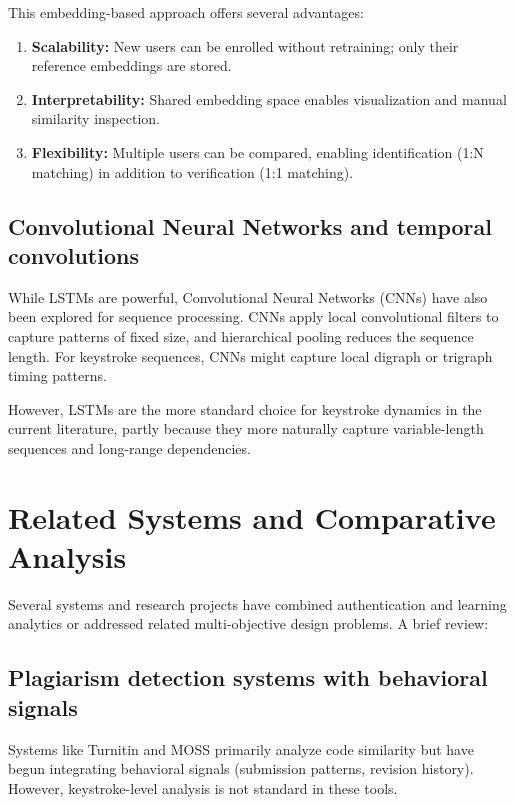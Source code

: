 This embedding-based approach offers several advantages:
\begin{enumerate}
  \item \textbf{Scalability:} New users can be enrolled without retraining; only their reference embeddings are stored.
  \item \textbf{Interpretability:} Shared embedding space enables visualization and manual similarity inspection.
  \item \textbf{Flexibility:} Multiple users can be compared, enabling identification (1:N matching) in addition to verification (1:1 matching).
\end{enumerate}

\subsection{Convolutional Neural Networks and temporal convolutions}

While LSTMs are powerful, Convolutional Neural Networks (CNNs) have also been explored for sequence processing. CNNs apply local convolutional filters to capture patterns of fixed size, and hierarchical pooling reduces the sequence length. For keystroke sequences, CNNs might capture local digraph or trigraph timing patterns.

However, LSTMs are the more standard choice for keystroke dynamics in the current literature, partly because they more naturally capture variable-length sequences and long-range dependencies.

\section{Related Systems and Comparative Analysis}
\label{sec:related-systems}

Several systems and research projects have combined authentication and learning analytics or addressed related multi-objective design problems. A brief review:

\subsection{Plagiarism detection systems with behavioral signals}

Systems like Turnitin and MOSS primarily analyze code similarity but have begun integrating behavioral signals (submission patterns, revision history). However, keystroke-level analysis is not standard in these tools.

